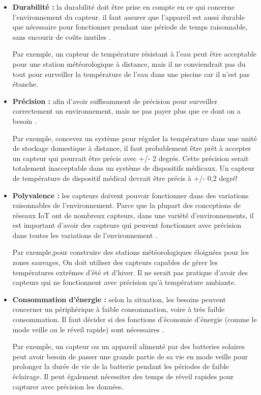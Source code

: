 \begin{itemize}
    \item \textbf{Durabilité :} la durabilité doit être prise en compte en ce qui concerne l'environnement du capteur. il faut assurer que l'appareil est aussi durable que nécessaire pour fonctionner pendant une période de temps raisonnable, sans encourir de coûts inutiles \cite{fedele2018energy}.
    
    
Par exemple, un capteur de température résistant à l'eau peut être acceptable pour une station météorologique à distance, mais il ne conviendrait pas du tout pour surveiller la température de l'eau dans une piscine car il n'est pas étanche.


\item \textbf{Précision :} afin d'avoir suffisamment de précision pour surveiller correctement un environnement, mais ne pas payer plus que ce dont on a besoin \cite{agarwal2016unified}.


Par exemple, concevez un système pour réguler la température dans une unité de stockage domestique à distance, il faut probablement être prêt  à accepter un capteur qui pourrait être précis avec +/- 2 degrés. Cette précision serait totalement inacceptable dans un système de dispositifs médicaux. Un capteur de température de dispositif médical devrait être précis à +/- 0,2 degré!

\item \textbf{Polyvalence :}  les capteurs doivent pouvoir fonctionner dans des variations raisonnables de l'environnement. Parce que la plupart des conceptions de réseaux IoT ont de nombreux capteurs, dans une variété d'environnements, il est important d'avoir des capteurs qui peuvent fonctionner avec précision dans toutes les variations de l'environnement \cite{santucci2010internet}.


Par exemple,pour construire des stations météorologiques éloignées pour les zones sauvages, On doit utiliser des capteurs capables de gérer les températures extrêmes d'été et d'hiver. Il ne serait pas pratique d'avoir des capteurs qui ne fonctionnent avec précision qu'à température ambiante.
\item \textbf{Consommation d'énergie : } selon la situation, les besoins peuvent concerner un périphérique à faible consommation, voire à très faible consommation. Il faut décider si des fonctions d'économie d'énergie (comme le mode veille ou le réveil rapide) sont nécessaires \cite{mainetti2011evolution}.


Par exemple, un capteur ou un appareil alimenté par des batteries solaires peut avoir besoin de passer une grande partie de sa vie en mode veille pour prolonger la durée de vie de la batterie pendant les périodes de faible éclairage. Il peut également nécessiter des temps de réveil rapides pour capturer avec précision les données.


\end{itemize}
